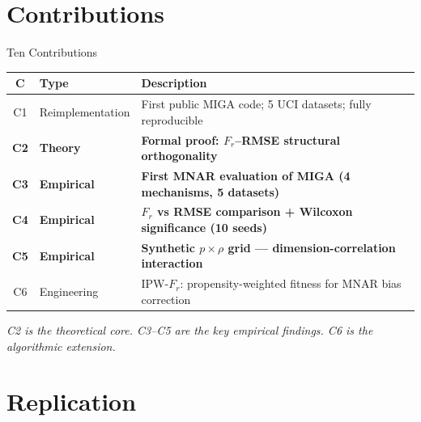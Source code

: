 \documentclass[aspectratio=169,12pt]{beamer}
\begin{document}
\section{Contributions}

\begin{frame}{Ten Contributions}

\renewcommand{\arraystretch}{1.25}
\begin{tabular}{clp{7.2cm}}
\toprule
\textbf{C} & \textbf{Type} & \textbf{Description} \\
\midrule
C1 & Reimplementation & First public MIGA code; 5 UCI datasets; fully reproducible \\
\textbf{C2} & \textbf{Theory} & \textbf{Formal proof: $F_r$--RMSE structural orthogonality} \\
\textbf{C3} & \textbf{Empirical} & \textbf{First MNAR evaluation of MIGA (4 mechanisms, 5 datasets)} \\
\textbf{C4} & \textbf{Empirical} & \textbf{$F_r$ vs RMSE comparison + Wilcoxon significance (10 seeds)} \\
\textbf{C5} & \textbf{Empirical} & \textbf{Synthetic $p \times \rho$ grid — dimension-correlation interaction} \\
C6 & Engineering & IPW-$F_r$: propensity-weighted fitness for MNAR bias correction \\
\bottomrule
\end{tabular}

\bigskip
\textit{C2 is the theoretical core. C3--C5 are the key empirical findings. C6 is the algorithmic extension.}

\end{frame}

\section{Replication}
\end{document}
